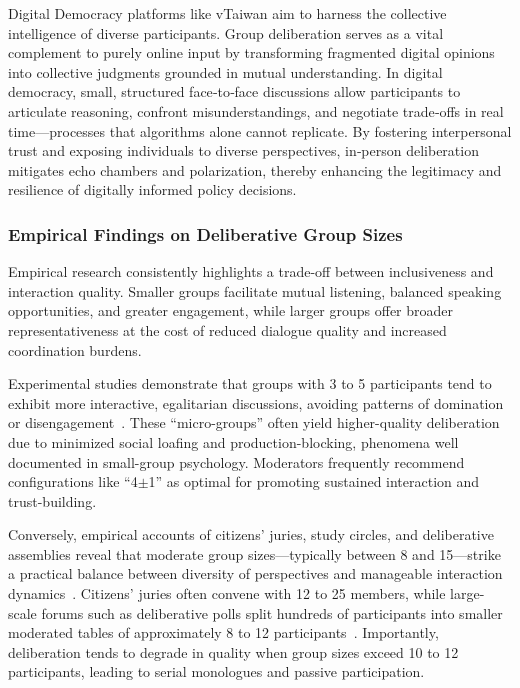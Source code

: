Digital Democracy platforms like vTaiwan aim to harness the collective intelligence of diverse participants.
Group deliberation serves as a vital complement to purely online input
by transforming fragmented digital opinions into collective judgments grounded in mutual understanding.
In digital democracy, small, structured face‐to‐face discussions allow participants to articulate reasoning,
confront misunderstandings, and negotiate trade‐offs in real time—processes that algorithms alone cannot replicate.
By fostering interpersonal trust and exposing individuals to diverse perspectives, in‐person deliberation mitigates
echo chambers and polarization, thereby enhancing the legitimacy and resilience of digitally informed policy decisions.

\subsubsection*{Empirical Findings on Deliberative Group Sizes}\label{subsec:group_sizes}

Empirical research consistently highlights a trade-off between inclusiveness and interaction quality.
Smaller groups facilitate mutual listening, balanced speaking opportunities, and greater engagement,
while larger groups offer broader representativeness at the cost of reduced dialogue quality
and increased coordination burdens.

Experimental studies demonstrate that groups with 3 to 5 participants tend to exhibit more interactive,
egalitarian discussions, avoiding patterns of domination or disengagement~\parencite{fay2000group}.
These \enquote{micro-groups} often yield higher-quality deliberation due to minimized social loafing
and production-blocking, phenomena well documented in small-group psychology.
Moderators frequently recommend configurations like \enquote{4$\pm$1} as optimal for promoting sustained interaction
and trust-building.

Conversely, empirical accounts of citizens’ juries, study circles, and deliberative assemblies reveal
that moderate group sizes—typically between 8 and 15—strike a practical balance between diversity of perspectives
and manageable interaction dynamics~\parencite{involve_citizensjury, participedia_citizensjury}.
Citizens’ juries often convene with 12 to 25 members,
while large-scale forums such as deliberative polls split hundreds of participants into smaller moderated tables
of approximately 8 to 12 participants~\parencite{fishkin2009deliberative}.
Importantly, deliberation tends to degrade in quality when group sizes exceed 10 to 12 participants,
leading to serial monologues and passive participation.

